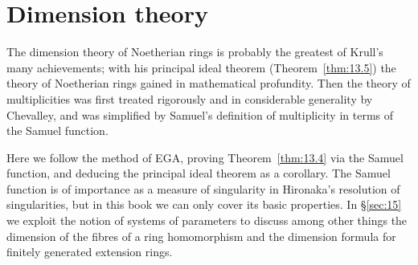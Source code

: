 \chapter{Dimension theory}\label{ch:5}

The dimension theory of Noetherian rings is probably the greatest of
Krull's many achievements; with his principal ideal theorem
(Theorem~\ref{thm:13.5}) the theory of Noetherian rings gained in mathematical
profundity. Then the theory of multiplicities was first treated rigorously
and in considerable generality by Chevalley, and was simplified by Samuel's
definition of multiplicity in terms of the Samuel function.

Here we follow the method of EGA, proving Theorem~\ref{thm:13.4} via the
Samuel function, and deducing the principal ideal theorem as a corollary.
The Samuel function is of importance as a measure of singularity in
Hironaka's resolution of singularities, but in this book we can only cover its
basic properties. In \S\ref{sec:15} we exploit the notion of systems of parameters to
discuss among other things the dimension of the fibres of a ring
homomorphism and the dimension formula for finitely generated extension
rings.





